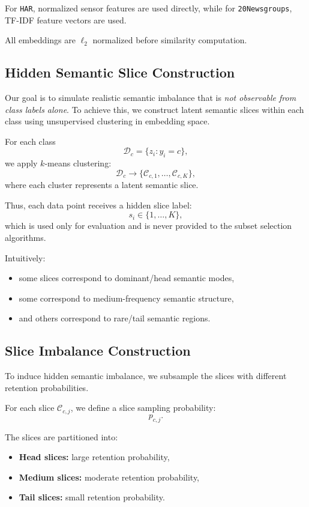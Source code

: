 \documentclass[11pt]{article}
\begin{document}
For \texttt{HAR}, normalized sensor features are used directly, while for \texttt{20Newsgroups}, TF-IDF feature vectors are used.

All embeddings are $\ell_2$ normalized before similarity computation.

\subsection{Hidden Semantic Slice Construction}

Our goal is to simulate realistic semantic imbalance that is \emph{not observable from class labels alone}. To achieve this, we construct latent semantic slices within each class using unsupervised clustering in embedding space.

For each class
\[
\mathcal{D}_c
=
\{z_i : y_i=c\},
\]
we apply $k$-means clustering:
\[
\mathcal{D}_c
\rightarrow
\{\mathcal{C}_{c,1},\ldots,\mathcal{C}_{c,K}\},
\]
where each cluster represents a latent semantic slice.

Thus, each data point receives a hidden slice label:
\[
s_i \in \{1,\ldots,K\},
\]
which is used only for evaluation and is never provided to the subset selection algorithms.

Intuitively:
\begin{itemize}
    \item some slices correspond to dominant/head semantic modes,
    \item some correspond to medium-frequency semantic structure,
    \item and others correspond to rare/tail semantic regions.
\end{itemize}

\subsection{Slice Imbalance Construction}

To induce hidden semantic imbalance, we subsample the slices with different retention probabilities.

For each slice $\mathcal{C}_{c,j}$, we define a slice sampling probability:
\[
p_{c,j}.
\]

The slices are partitioned into:
\begin{itemize}
    \item \textbf{Head slices:} large retention probability,
    \item \textbf{Medium slices:} moderate retention probability,
    \item \textbf{Tail slices:} small retention probability.
\end{itemize}
\end{document}
